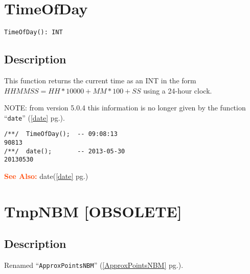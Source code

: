 \documentclass[a4paper]{mybook}
\newenvironment{command}{}{} %
\newcommand\SeeAlso{\par\textcolor{OrangeRed}{\textbf{\large See Also: }}}
\begin{document}
\section{TimeOfDay}
\label{TimeOfDay}
\begin{command} %


\begin{Verbatim}[label=syntax, rulecolor=\color{MidnightBlue},
frame=single]
TimeOfDay(): INT
\end{Verbatim}


\subsection*{Description}

This function returns the current time as an INT in the form
$HHMMSS = HH*10000+MM*100+SS$ using a 24-hour clock.
\par 
NOTE: from version 5.0.4 this information is no longer given by
the function ``\verb&date&'' (\ref{date} pg.\pageref{date}).
\begin{Verbatim}[label=example, rulecolor=\color{PineGreen}, frame=single]
/**/  TimeOfDay();  -- 09:08:13
90813
/**/  date();       -- 2013-05-30
20130530
\end{Verbatim}


\SeeAlso %
  date(\ref{date} pg.\pageref{date})
\end{command} %

\section{TmpNBM [OBSOLETE]}
\label{TmpNBM [OBSOLETE]}
\begin{command} %



\subsection*{Description}

Renamed ``\verb&ApproxPointsNBM&'' (\ref{ApproxPointsNBM} pg.\pageref{ApproxPointsNBM}).

\end{command} %
\end{document}
